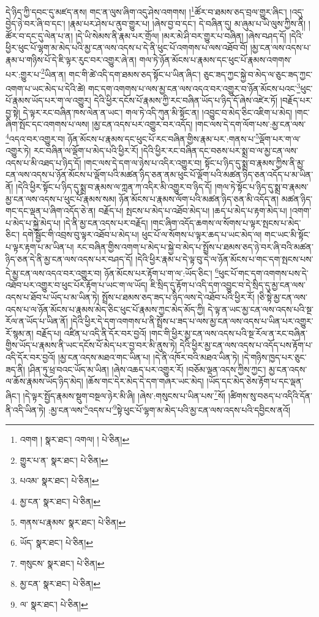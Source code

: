 དེ་ཉིད་ཀྱི་དབང་དུ་མཛད་ནས། གང་ན་ལུས་ཞིག་འདུ་ཤེས་འགགས། །\footnote{འགག །  སྣར་ཐང་། འགལ། །  པེ་ཅིན། }ཚོར་བ་ཐམས་ཅད་བྲལ་གྱུར་ཞིང་། །འདུ་བྱེད་ཉེ་བར་ཞི་བ་དང་། །རྣམ་པར་ཤེས་པ་ནུབ་གྱུར་པ། །ཞེས་བྱ་བ་དང་། དེ་བཞིན་དུ། མ་ཞུམ་པ་ཡི་ལུས་ཀྱིས་ནི། །ཚོར་བ་དང་དུ་ལེན་པ་ན། །དེ་ཡི་སེམས་ནི་རྣམ་པར་གྲོལ། །མར་མེ་ཤི་བར་གྱུར་པ་བཞིན། །ཞེས་བཤད་དོ། །དེའི་ཕྱིར་ཕུང་པོ་ལྷག་མ་མེད་པའི་མྱ་ངན་ལས་འདས་པ་དེ་ནི་ཕུང་པོ་འགགས་པ་ལས་འཐོབ་བོ། །མྱ་ངན་ལས་འདས་པ་རྣམ་པ་གཉིས་པོ་དེ་ཇི་ལྟར་རུང་བར་འགྱུར་ཞེ་ན། གལ་ཏེ་ཉོན་མོངས་པ་རྣམས་དང་ཕུང་པོ་རྣམས་འགགས་པར་:གྱུར་པ་\footnote{གྱུར་པ་ན་  སྣར་ཐང་།  པེ་ཅིན། }ཡིན་ན། གང་གི་ཚེ་འདི་དག་ཐམས་ཅད་སྟོང་པ་ཡིན་ཞིང་། ཅུང་ཟད་ཀྱང་སྐྱེ་བ་མེད་ལ་ཅུང་ཟད་ཀྱང་འགག་པ་ཡང་མེད་པ་དེའི་ཚེ། གང་དག་འགགས་པ་ལས་མྱ་ངན་ལས་འདའ་བར་འགྱུར་བ་ཉོན་མོངས་པའང་\footnote{པའམ་  སྣར་ཐང་།  པེ་ཅིན། }ཕུང་པོ་རྣམས་ཡོད་པར་ག་ལ་འགྱུར། དེའི་ཕྱིར་དངོས་པོ་རྣམས་ཀྱི་རང་བཞིན་ཡོད་པ་ཉིད་དོ་ཞེས་འཛེར་ཏོ། །བརྗོད་པར་བྱ་སྟེ། དེ་ལྟར་རང་བཞིན་ཁས་ལེན་ན་ཡང་། གལ་ཏེ་འདི་ཀུན་མི་སྟོང་ན། །འབྱུང་བ་མེད་ཅིང་འཇིག་པ་མེད། །གང་ཞིག་སྤོང་དང་འགགས་པ་ལས། །མྱ་ངན་འདས་པར་འགྱུར་བར་འདོད། །གང་ལས་དེ་དག་ལོག་པས་:མྱ་ངན་ལས་\footnote{མྱ་ངན་  སྣར་ཐང་།  པེ་ཅིན། }འདའ་བར་འགྱུར་བ། ཉོན་མོངས་པ་རྣམས་དང་ཕུང་པོ་རང་བཞིན་གྱིས་རྣམ་པར་:གནས་པ་\footnote{གནས་པ་རྣམས་  སྣར་ཐང་།  པེ་ཅིན། }ལྡོག་པར་ག་ལ་འགྱུར་ཏེ། རང་བཞིན་ལ་ལྡོག་པ་མེད་པའི་ཕྱིར་རོ། །དེའི་ཕྱིར་རང་བཞིན་དང་བཅས་པར་སྨྲ་བ་ལ་མྱ་ངན་ལས་འདས་པ་མི་འཐད་པ་ཉིད་དོ། །གང་ལས་དེ་དག་ལ་ཉེས་པ་འདིར་འགྱུར་བ། སྟོང་པ་ཉིད་དུ་སྨྲ་བ་རྣམས་ཀྱིས་ནི་མྱ་ངན་ལས་འདས་པ་ཉོན་མོངས་པ་ལྡོག་པའི་མཚན་ཉིད་ཅན་ནམ་ཕུང་པོ་ལྡོག་པའི་མཚན་ཉིད་ཅན་འདོད་པ་མ་ཡིན་ནོ། །དེའི་ཕྱིར་སྟོང་པ་ཉིད་དུ་སྨྲ་བ་རྣམས་ལ་ཀླན་ཀ་འདིར་མི་འགྱུར་བ་ཉིད་དོ། །གལ་ཏེ་སྟོང་པ་ཉིད་དུ་སྨྲ་བ་རྣམས་མྱ་ངན་ལས་འདས་པ་ཕུང་པོ་རྣམས་སམ། ཉོན་མོངས་པ་རྣམས་ལོག་པའི་མཚན་ཉིད་ཅན་མི་འདོད་ན། མཚན་ཉིད་གང་དང་ལྡན་པ་ཞིག་འདོད་ཅེ་ན། བརྗོད་པ། སྤངས་པ་མེད་པ་འཐོབ་མེད་པ། །ཆད་པ་མེད་པ་རྟག་མེད་པ། །འགག་པ་མེད་པ་སྐྱེ་མེད་པ། །དེ་ནི་མྱ་ངན་འདས་པར་བརྗོད། །གང་ཞིག་འདོད་ཆགས་ལ་སོགས་པ་ལྟར་སྤངས་པ་མེད་ཅིང་། དགེ་སྦྱོང་གི་འབྲས་བུ་ལྟར་འཐོབ་པ་མེད་པ། ཕུང་པོ་ལ་སོགས་པ་ལྟར་ཆད་པ་ཡང་མེད་ལ། གང་ཡང་མི་སྟོང་པ་ལྟར་རྟག་པ་མ་ཡིན་པ། རང་བཞིན་གྱིས་འགག་པ་མེད་པ་སྐྱེ་བ་མེད་པ་སྤྲོས་པ་ཐམས་ཅད་ཉེ་བར་ཞི་བའི་མཚན་ཉིད་ཅན་དེ་ནི་མྱ་ངན་ལས་འདས་པར་བཤད་དོ། །དེའི་ཕྱིར་རྣམ་པ་དེ་ལྟ་བུ་དེ་ལ་ཉོན་མོངས་པ་གང་དག་སྤངས་པས་དེ་མྱ་ངན་ལས་འདའ་བར་འགྱུར་བ། ཉོན་མོངས་པར་རྟོག་པ་ག་ལ་:ཡོད་ཅིང་། \footnote{ཡོད་  སྣར་ཐང་།  པེ་ཅིན། }ཕུང་པོ་གང་དག་འགགས་པས་དེ་འཐོབ་པར་འགྱུར་བ་ཕུང་པོར་རྟོག་པ་ཡང་ག་ལ་ཡོད། ཇི་སྲིད་དུ་རྟོག་པ་འདི་དག་འབྱུང་བ་དེ་སྲིད་དུ་མྱ་ངན་ལས་འདས་པ་ཐོབ་པ་ཡོད་པ་མ་ཡིན་ཏེ། སྤྲོས་པ་ཐམས་ཅད་ཟད་པ་ཉིད་ལས་དེ་འཐོབ་པའི་ཕྱིར་རོ། །ཅི་སྟེ་མྱ་ངན་ལས་འདས་པ་ལ་ཉོན་མོངས་པ་རྣམས་མེད་ཅིང་ཕུང་པོ་རྣམས་ཀྱང་མེད་མོད་ཀྱི། དེ་ལྟ་ན་ཡང་མྱ་ངན་ལས་འདས་པའི་སྔ་རོལ་ན་ཡོད་པ་ཡིན་ནོ། །དེའི་ཕྱིར་དེ་དག་འགགས་པ་ནི་སྤྲོས་པ་ཟད་པ་ལས་མྱ་ངན་ལས་འདས་པ་ཡིན་པར་འགྱུར་རོ་སྙམ་ན། བརྗོད་པ། འཛིན་པ་འདི་ནི་དོར་བར་བྱའོ། །གང་གི་ཕྱིར་མྱ་ངན་ལས་འདས་པའི་སྔ་རོལ་ན་རང་བཞིན་གྱིས་ཡོད་པ་རྣམས་ནི་ཡང་དངོས་པོ་མེད་པར་བྱ་བར་མི་ནུས་ཏེ། དེའི་ཕྱིར་མྱ་ངན་ལས་འདས་པ་འདོད་པས་རྟོག་པ་འདི་དོར་བར་བྱའོ། །མྱ་ངན་འདས་མཐའ་གང་ཡིན་པ། །དེ་ནི་འཁོར་བའི་མཐའ་ཡིན་ཏེ། །དེ་གཉིས་ཁྱད་པར་ཅུང་ཟད་ནི། །ཤིན་ཏུ་ཕྲ་བའང་ཡོད་མ་ཡིན། །ཞེས་འཆད་པར་འགྱུར་རོ། །བཅོམ་ལྡན་འདས་ཀྱིས་ཀྱང་། མྱ་ངན་འདས་ལ་ཆོས་རྣམས་ཡོད་ཉིད་མེད། །ཆོས་གང་དེར་མེད་དེ་དག་གཞར་ཡང་མེད། །ཡོད་དང་མེད་ཅེས་རྟོག་པ་དང་ལྡན་ཞིང་། །དེ་ལྟར་སྤྱོད་རྣམས་སྡུག་བསྔལ་ཉེར་མི་ཞི། །ཞེས་:གསུངས་པ་ཡིན་པས་\footnote{གསུངས་  སྣར་ཐང་།  པེ་ཅིན། }སོ། །ཚིགས་སུ་བཅད་པ་འདིའི་དོན་ནི་འདི་ཡིན་ཏེ། :མྱ་ངན་ལས་\footnote{མྱ་ངན་  སྣར་ཐང་།  པེ་ཅིན། }འདས་པ་\footnote{ལ་  སྣར་ཐང་།  པེ་ཅིན། }སྟེ་ཕུང་པོ་ལྷག་མ་མེད་པའི་མྱ་ངན་ལས་འདས་པའི་དབྱིངས་ནའོ། 